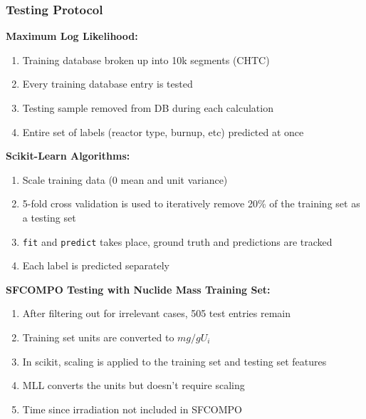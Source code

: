 
\begin{frame}
  \frametitle{Testing Protocol}
  \textbf{Maximum Log Likelihood:}
  \begin{enumerate}
    \footnotesize
    \item Training database broken up into 10k segments (CHTC)
    \item Every training database entry is tested
    \item Testing sample removed from DB during each calculation
    \item Entire set of labels (reactor type, burnup, etc) predicted at once
  \end{enumerate}
  \textbf{Scikit-Learn Algorithms:}
  \begin{enumerate}
    \footnotesize
    \item Scale training data ($0$ mean and unit variance)
    \item 5-fold cross validation is used to iteratively remove 20\% of the training set as a testing set
    \item \texttt{fit} and \texttt{predict} takes place, ground truth and predictions are tracked
    \item Each label is predicted separately
  \end{enumerate}
  \textbf{SFCOMPO Testing with Nuclide Mass Training Set:}
  \begin{enumerate}
    \footnotesize
    \item After filtering out for irrelevant cases, 505 test entries remain
    \item Training set units are converted to $mg/gU_i$
    \item In scikit, scaling is applied to the training set and testing set features
    \item MLL converts the units but doesn't require scaling
    \item Time since irradiation not included in SFCOMPO
  \end{enumerate}
\end{frame}

